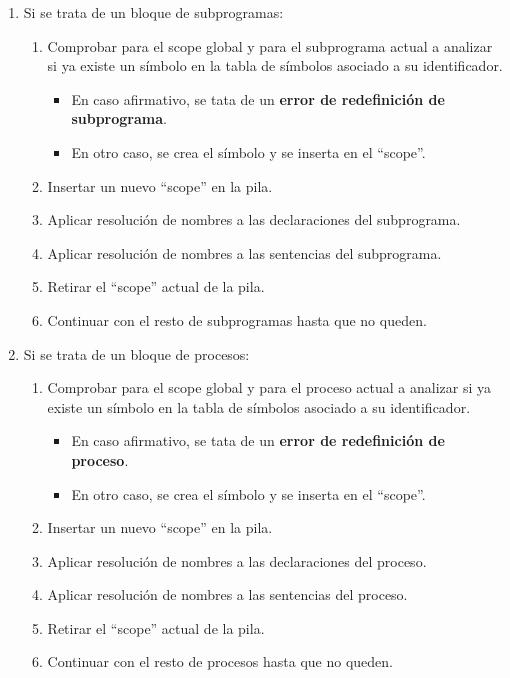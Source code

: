 \begin{enumerate}
\begin{itemize}
\begin{itemize}
        \end{itemize}
    \end{itemize}
    \item Si se trata de un bloque de subprogramas:
    \begin{enumerate}
        \item Comprobar para el scope global y para el subprograma actual a analizar si ya existe un símbolo en la tabla de símbolos asociado a su identificador.
        \begin{itemize}
            \item En caso afirmativo, se tata de un \textbf{error de redefinición de subprograma}.
            \item En otro caso, se crea el símbolo y se inserta en el ``scope''.
        \end{itemize}
        \item Insertar un nuevo ``scope'' en la pila.
        \item Aplicar resolución de nombres a las declaraciones del subprograma.
        \item Aplicar resolución de nombres a las sentencias del subprograma.
        \item Retirar el ``scope'' actual de la pila.

        \item Continuar con el resto de subprogramas hasta que no queden.
    \end{enumerate}
    \item Si se trata de un bloque de procesos:
    \begin{enumerate}
        \item Comprobar para el scope global y para el proceso actual a analizar si ya existe un símbolo en la tabla de símbolos asociado a su identificador.
        \begin{itemize}
            \item En caso afirmativo, se tata de un \textbf{error de redefinición de proceso}.
            \item En otro caso, se crea el símbolo y se inserta en el ``scope''.
        \end{itemize}
        \item Insertar un nuevo ``scope'' en la pila.
        \item Aplicar resolución de nombres a las declaraciones del proceso.
        \item Aplicar resolución de nombres a las sentencias del proceso.
        \item Retirar el ``scope'' actual de la pila.

        \item Continuar con el resto de procesos hasta que no queden.
    \end{enumerate}
\end{enumerate}

